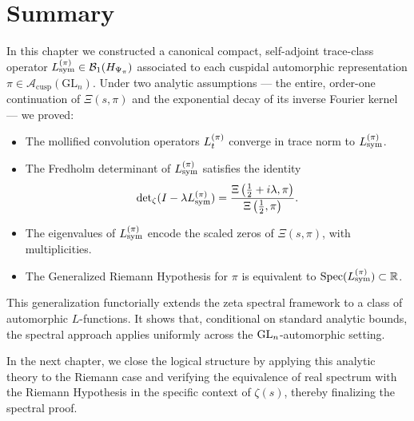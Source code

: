 \section*{Summary}

In this chapter we constructed a canonical compact, self-adjoint trace-class operator \( L_{\mathrm{sym}}^{(\pi)} \in \mathcal{B}_1(H_{\Psi_{\pi}}) \) associated to each cuspidal automorphic representation \( \pi \in \mathcal{A}_{\mathrm{cusp}}(\mathrm{GL}_n) \). Under two analytic assumptions — the entire, order-one continuation of \( \Xi(s, \pi) \) and the exponential decay of its inverse Fourier kernel — we proved:

\begin{itemize}
  \item The mollified convolution operators \( L_t^{(\pi)} \) converge in trace norm to \( L_{\mathrm{sym}}^{(\pi)} \).
  \item The Fredholm determinant of \( L_{\mathrm{sym}}^{(\pi)} \) satisfies the identity
  \[
  \det\nolimits_{\zeta}(I - \lambda L_{\mathrm{sym}}^{(\pi)}) = \frac{\Xi\left(\tfrac{1}{2} + i\lambda, \pi\right)}{\Xi\left(\tfrac{1}{2}, \pi\right)}.
  \]
  \item The eigenvalues of \( L_{\mathrm{sym}}^{(\pi)} \) encode the scaled zeros of \( \Xi(s, \pi) \), with multiplicities.
  \item The Generalized Riemann Hypothesis for \( \pi \) is equivalent to \( \operatorname{Spec}(L_{\mathrm{sym}}^{(\pi)}) \subset \mathbb{R} \).
\end{itemize}

This generalization functorially extends the zeta spectral framework to a class of automorphic \( L \)-functions. It shows that, conditional on standard analytic bounds, the spectral approach applies uniformly across the \( \mathrm{GL}_n \)-automorphic setting. 

In the next chapter, we close the logical structure by applying this analytic theory to the Riemann case and verifying the equivalence of real spectrum with the Riemann Hypothesis in the specific context of \( \zeta(s) \), thereby finalizing the spectral proof.
